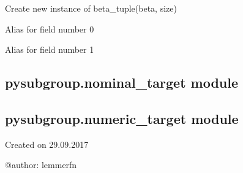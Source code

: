 \documentclass[letterpaper,10pt,english]{sphinxmanual}
\begin{document}
\begin{fulllineitems}
\label{\detokenize{source/pysubgroup:pysubgroup.model_target.beta_tuple}}
Create new instance of beta\_tuple(beta, size)

\begin{fulllineitems}
\label{\detokenize{source/pysubgroup:pysubgroup.model_target.beta_tuple.beta}}
Alias for field number 0

\end{fulllineitems}


\begin{fulllineitems}
\label{\detokenize{source/pysubgroup:pysubgroup.model_target.beta_tuple.size}}
Alias for field number 1

\end{fulllineitems}


\end{fulllineitems}



\subsection{pysubgroup.nominal\_target module}
\label{\detokenize{source/pysubgroup:pysubgroup-nominal-target-module}}

\subsection{pysubgroup.numeric\_target module}
\label{\detokenize{source/pysubgroup:module-pysubgroup.numeric_target}}\label{\detokenize{source/pysubgroup:pysubgroup-numeric-target-module}}
Created on 29.09.2017

@author: lemmerfn
\end{document}
